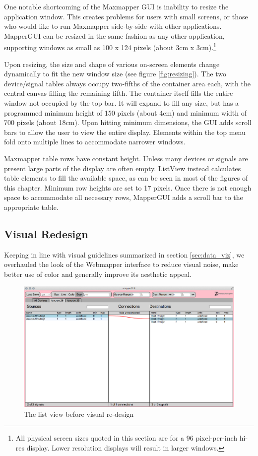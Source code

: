 One notable shortcoming of the Maxmapper GUI is inability to resize the application window. This creates problems for users with small screens, or those who would like to run Maxmapper side-by-side with other applications. MapperGUI can be resized in the same fashion as any other application, supporting windows as small as 100 x 124 pixels (about 3cm x 3cm).\footnote{All physical screen sizes quoted in this section are for a 96 pixel-per-inch hi-res display. Lower resolution displays will result in larger windows.}

Upon resizing, the size and shape of various on-screen elements change dynamically to fit the new window size (see figure \ref{fig:resizing}). The two device/signal tables always occupy two-fifths of the container area each, with the central canvas filling the remaining fifth. The container itself fills the entire window not occupied by the top bar. It will expand to fill any size, but has a programmed minimum height of 150 pixels (about 4cm) and minimum width of 700 pixels (about 18cm). Upon hitting minimum dimensions, the GUI adds scroll bars to allow the user to view the entire display. Elements within the top menu fold onto multiple lines to accommodate narrower windows.


Maxmapper table rows have constant height. Unless many devices or signals are present large parts of the display are often empty. ListView instead calculates table elements to fill the available space, as can be seen in most of the figures of this chapter. Minimum row heights are set to 17 pixels. Once there is not enough space to accommodate all necessary rows, MapperGUI adds a scroll bar to the appropriate table. 


	\subsection{Visual Redesign} %
	\label{sec:visual_redesign}

Keeping in line with visual guidelines summarized in section \ref{sec:data_viz}, we overhauled the look of the Webmapper interface to reduce visual noise, make better use of color and generally improve its aesthetic appeal. 

\begin{figure}[h]
\centering
	\includegraphics[width=\textwidth]{figures/before_redesign}
\caption{The list view before visual re-design}
\label{fig:before_redesign}
\end{figure}

